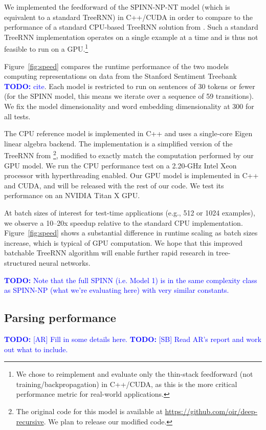\documentclass[11pt]{article}
\newcommand\todo[1]{\textcolor{blue}{\textbf{TODO:} #1}}
\begin{document}
We implemented the feedforward of the SPINN-NP-NT model (which is equivalent to a standard TreeRNN) in C++/CUDA in order to compare to the performance of a standard CPU-based TreeRNN solution from \citet{irsoy2014deep}. Such a standard TreeRNN implementation operates on a single example at a time and is thus not feasible to run on a GPU.\footnote{We chose to reimplement and evaluate only the thin-stack feedforward (not training/backpropagation) in C++/CUDA, as this is the more critical performance metric for real-world applications.}

Figure~\ref{fig:speed} compares the runtime performance of the two models computing representations on data from the Stanford Sentiment Treebank \todo{cite}. Each model is restricted to run on sentences of 30 tokens or fewer (for the SPINN model, this means we iterate over a sequence of 59 transitions). We fix the model dimensionality and word embedding dimensionality at 300 for all tests.

The CPU reference model is implemented in C++ and uses a single-core Eigen linear algebra backend. The implementation is a simplified version of the TreeRNN from \citet{irsoy2014deep}\footnote{The original code for this model is available at \url{https://github.com/oir/deep-recursive}. We plan to release our modified code.}, modified to exactly match the computation performed by our GPU model. We run the CPU performance test on a 2.20-GHz Intel Xeon processor with hyperthreading enabled. Our GPU model is implemented in C++ and CUDA, and will be released with the rest of our code. We test its performance on an NVIDIA Titan X GPU.

At batch sizes of interest for test-time applications (e.g., 512 or 1024 examples), we observe a 10--20x speedup relative to the standard CPU implementation. Figure~\ref{fig:speed} shows a substantial difference in runtime scaling as batch sizes increase, which is typical of GPU computation. We hope that this improved batchable TreeRNN algorithm will enable further rapid research in tree-structured neural networks.

\todo{Note that the full SPINN (i.e. Model 1) is in the same complexity class as SPINN-NP (what we're evaluating here) with very similar constants.}

\subsection{Parsing performance}

\todo{[AR] Fill in some details here.}
\todo{[SB] Read AR's report and work out what to include.}
\end{document}
